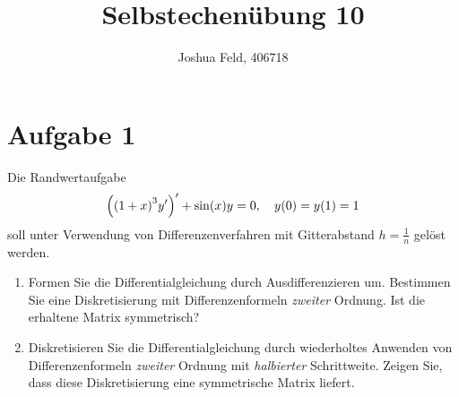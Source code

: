 \documentclass{exercise}
\institute{Applied and Computational Mathematics}
\title{Selbstechenübung 10}
\author{Joshua Feld, 406718}
\begin{document}
    \maketitle


    \section*{Aufgabe 1}

    \begin{problem}
        Die Randwertaufgabe
        \[
            \parentheses*{\parentheses*{1 + x}^3 y'}' + \sin\parentheses*{x}y = 0, \quad y\parentheses*{0} = y\parentheses*{1} = 1
        \]
        soll unter Verwendung von Differenzenverfahren mit Gitterabstand \(h = \frac{1}{n}\) gelöst werden.
        \begin{enumerate}
            \item Formen Sie die Differentialgleichung durch Ausdifferenzieren um.
            Bestimmen Sie eine Diskretisierung mit Differenzenformeln \emph{zweiter} Ordnung.
            Ist die erhaltene Matrix symmetrisch?
            \item Diskretisieren Sie die Differentialgleichung durch wiederholtes Anwenden von Differenzenformeln \emph{zweiter} Ordnung mit \emph{halbierter} Schrittweite.
            Zeigen Sie, dass diese Diskretisierung eine symmetrische Matrix liefert.
        \end{enumerate}
    \end{problem}
    
\end{document}
